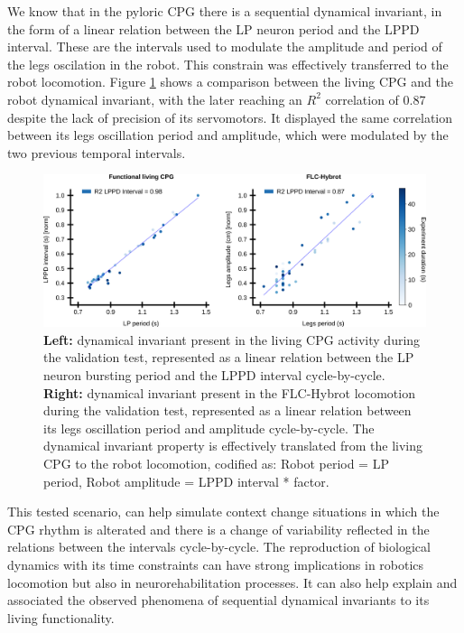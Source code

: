 We know that in the pyloric CPG there is a sequential dynamical invariant, in the form of a linear relation between the LP neuron period and the LPPD interval. These are the intervals used to modulate the amplitude and period of the legs oscilation in the robot. This constrain was effectively transferred to the robot locomotion. Figure \ref{fig:robot_results_invariant} shows a comparison between the living CPG and the robot dynamical invariant, with the later reaching an $R^2$ correlation of 0.87 despite the lack of precision of its servomotors. It displayed the same correlation between its legs oscillation period and amplitude, which were modulated by the two previous temporal intervals.

\begin{figure}[hbt!]
	\begin{center}
		\includegraphics[width=\linewidth]{./img/invariants/robot/robot_results_invariant}
	\end{center}
	\caption{\textbf{Left:} dynamical invariant present in the living CPG activity during the validation test, represented as a linear relation between the LP neuron bursting period and the LPPD interval cycle-by-cycle. \textbf{Right:} dynamical invariant present in the FLC-Hybrot locomotion during the validation test, represented as a linear relation between its legs oscillation period and amplitude cycle-by-cycle. The dynamical invariant property is effectively translated from the living CPG to the robot locomotion, codified as: Robot period = LP period, Robot amplitude = LPPD interval * factor.}
	\label{fig:robot_results_invariant}
\end{figure}

This tested scenario, can help simulate context change situations in which the CPG rhythm is alterated and there is a change of variability reflected in the relations between the intervals cycle-by-cycle. The reproduction of biological dynamics with its time constraints can have strong implications in robotics locomotion but also in neurorehabilitation processes. It can also help explain and associated the observed phenomena of sequential dynamical invariants to its living functionality.
